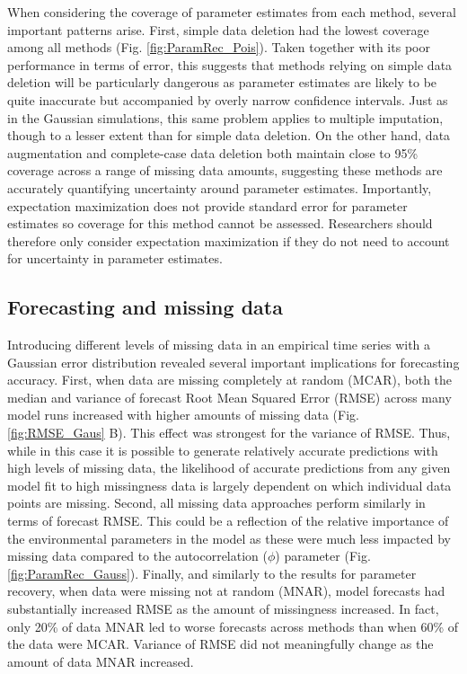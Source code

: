 \documentclass{article}
\begin{document}
When considering the coverage of parameter estimates from each method, several important patterns arise. First, simple data deletion had the lowest coverage among all methods (Fig. \ref{fig:ParamRec_Pois}). Taken together with its poor performance in terms of error, this suggests that methods relying on simple data deletion will be particularly dangerous as parameter estimates are likely to be quite inaccurate but accompanied by overly narrow confidence intervals. Just as in the Gaussian simulations, this same problem applies to multiple imputation, though to a lesser extent than for simple data deletion. On the other hand, data augmentation and complete-case data deletion both maintain close to 95\% coverage across a range of missing data amounts, suggesting these methods are accurately quantifying uncertainty around parameter estimates. Importantly, expectation maximization does not provide standard error for parameter estimates so coverage for this method cannot be assessed. Researchers should therefore only consider expectation maximization if they do not need to account for uncertainty in parameter estimates.


\subsection*{Forecasting and missing data}
Introducing different levels of missing data in an empirical time series with a Gaussian error distribution revealed several important implications for forecasting accuracy. First, when data are missing completely at random (MCAR), both the median and variance of forecast Root Mean Squared Error (RMSE) across many model runs increased with higher amounts of missing data (Fig. \ref{fig:RMSE_Gaus} B). This effect was strongest for the variance of RMSE. Thus, while in this case it is possible to generate relatively accurate predictions with high levels of missing data, the likelihood of accurate predictions from any given model fit to high missingness data is largely dependent on which individual data points are missing. Second, all missing data approaches perform similarly in terms of forecast RMSE. This could be a reflection of the relative importance of the environmental parameters in the model as these were much less impacted by missing data compared to the autocorrelation ($\phi$) parameter (Fig. \ref{fig:ParamRec_Gauss}). Finally, and similarly to the results for parameter recovery, when data were missing not at random (MNAR), model forecasts had substantially increased RMSE as the amount of missingness increased. In fact, only 20\% of data MNAR led to worse forecasts across methods than when 60\% of the data were MCAR. Variance of RMSE did not meaningfully change as the amount of data MNAR increased. 
\end{document}
